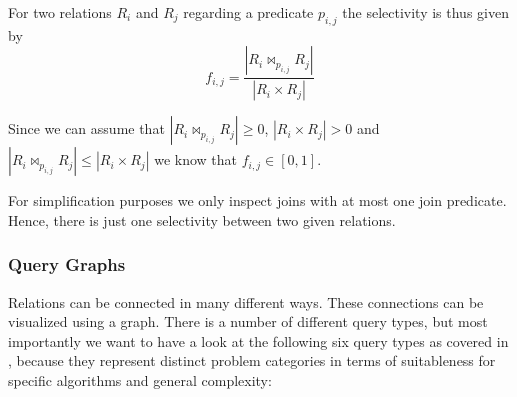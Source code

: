 For two relations $R_i$ and $R_j$ regarding a predicate $p_{i,j}$ the selectivity is thus given by 
\begin{equation}
f_{i,j} = \frac{|R_i\Join_{p_{i,j}}R_j|}{|R_i \times R_j|}	
\end{equation}

\begin{note}
Since we can assume that $|R_i\Join_{p_{i,j}}R_j| \geq 0$, $|R_i \times R_j| > 0$ and $|R_i\Join_{p_{i,j}}R_j| \leq |R_i \times R_j|$ we know that $f_{i,j} \in [0,1]$.
\end{note}

For simplification purposes we only inspect joins with at most one join predicate. Hence, there is just one selectivity between two given relations.

\subsubsection{Query Graphs}
\label{subsub:query-types}

Relations can be connected in many different ways. These connections can be visualized using a graph. There is a number of different query types, but most importantly we want to have a look at the following six query types as covered in \cite{moerkotte2009building}, because they represent distinct problem categories in terms of suitableness for specific algorithms and general complexity:

